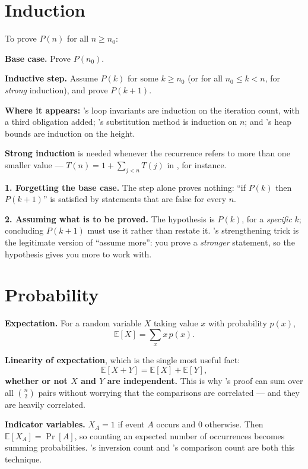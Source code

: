 \section{Induction}

\begin{conceptbox}
To prove $P(n)$ for all $n \ge n_{0}$:
\begin{tightnum}
  \item \textbf{Base case.} Prove $P(n_{0})$.
  \item \textbf{Inductive step.} Assume $P(k)$ for some $k \ge n_{0}$ (or for
        all $n_{0} \le k < n$, for \emph{strong} induction), and prove
        $P(k+1)$.
\end{tightnum}

\smallskip
\textbf{Where it appears:} 's loop invariants are induction
on the iteration count, with a third obligation added; 's
substitution method is induction on $n$; and 's heap bounds
are induction on the height.

\smallskip
\textbf{Strong induction} is needed whenever the recurrence refers to more than
one smaller value --- $T(n) = 1 + \sum_{j<n} T(j)$ in , for
instance.
\end{conceptbox}

\begin{alertbox}
\textbf{1. Forgetting the base case.} The step alone proves nothing: ``if
$P(k)$ then $P(k+1)$'' is satisfied by statements that are false for every $n$.

\smallskip
\textbf{2. Assuming what is to be proved.} The hypothesis is $P(k)$, for a
\emph{specific} $k$; concluding $P(k+1)$ must use it rather than restate it.
's strengthening trick is the legitimate version of
``assume more'': you prove a \emph{stronger} statement, so the hypothesis gives
you more to work with.
\end{alertbox}

\section{Probability}

\begin{conceptbox}
\textbf{Expectation.} For a random variable $X$ taking value $x$ with
probability $p(x)$,
\[ \mathbb{E}[X] = \sum_{x} x\,p(x). \]

\smallskip
\textbf{Linearity of expectation}, which is the single most useful fact:
\[ \mathbb{E}[X + Y] = \mathbb{E}[X] + \mathbb{E}[Y], \]
\textbf{whether or not $X$ and $Y$ are independent.} This is why
's proof can sum over all $\binom{n}{2}$ pairs without
worrying that the comparisons are correlated --- and they are heavily
correlated.

\smallskip
\textbf{Indicator variables.} $X_{A} = 1$ if event $A$ occurs and 0 otherwise.
Then $\mathbb{E}[X_{A}] = \Pr[A]$, so counting an expected number of
occurrences becomes summing probabilities. 's inversion count and
's comparison count are both this technique.
\end{conceptbox}

